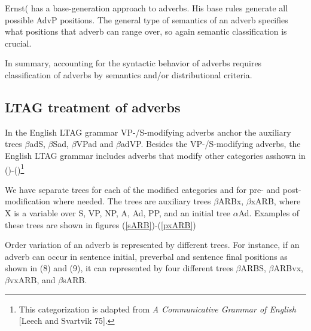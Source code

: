 Ernst( has a base-generation approach to adverbs.
His base rules generate all possible AdvP positions.  The general
type of semantics of an adverb specifies what positions that adverb
can range over, so again semantic classification is crucial.

In summary, accounting for the syntactic behavior of adverbs requires
classification of adverbs by semantics and/or distributional criteria.
  

\subsection{LTAG treatment of adverbs}
In the English LTAG grammar VP-/S-modifying adverbs anchor the
auxiliary trees $\beta$adS, $\beta$Sad, $\beta$VPad and $\beta$adVP.
Besides the VP-/S-modifying adverbs, the English LTAG grammar includes
adverbs that modify other categories asshown in ()-()\footnote{This categorization is adapted  from {\em A Communicative
Grammar of English\/} [Leech and Svartvik 75].}




We have separate trees for each of the modified categories and for
pre- and post-modification where needed.   The trees are auxiliary
trees $\beta$ARBx, $\beta$xARB, where X is a variable over S, VP, NP, A,
Ad, PP, and an initial tree $\alpha$Ad. Examples of these trees are
shown in figures (\ref{sARB})-(\ref{pxARB})





Order variation of an adverb is represented by different trees. For
instance, if an adverb can occur in sentence initial, preverbal and
sentence final positions as shown in (8) and (9), it can represented by
four different trees $\beta$ARBS, $\beta$ARBvx, $\beta$vxARB, and
$\beta$sARB.

